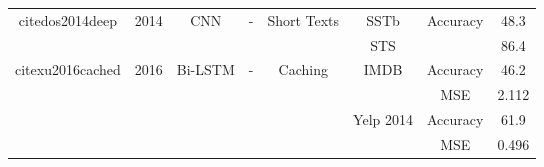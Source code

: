 \documentclass[12pt, a4paper, oneside]{report}
\begin{document}
\begin{tabular}{|c|c|c|c|c|c|cc|}
    \multirow{2}{*}{cite{dos2014deep}}                  & \multirow{2}{*}{2014} & \multirow{2}{*}{CNN}              & \multirow{2}{*}{-}                      & \multirow{2}{*}{Short Texts}                                                                           & SSTb                                  & \multicolumn{1}{c|}{\multirow{2}{*}{Accuracy}}                                                                                     & 48.3   \\ \cline{6-6} \cline{8-8} 
                                                                          &                       &                                   &                                         &                                                                                                        & STS                                   & \multicolumn{1}{c|}{}                                                                                                              & 86.4   \\ \hline
    \multirow{6}{*}{cite{xu2016cached}}                 & \multirow{6}{*}{2016} & \multirow{6}{*}{Bi-LSTM}          & \multirow{6}{*}{-}                      & \multirow{6}{*}{Caching}                                                                               & \multirow{2}{*}{IMDB}                 & \multicolumn{1}{c|}{Accuracy}                                                                                                      & 46.2   \\ \cline{7-8} 
                                                                          &                       &                                   &                                         &                                                                                                        &                                       & \multicolumn{1}{c|}{MSE}                                                                                                           & 2.112  \\ \cline{6-8} 
                                                                          &                       &                                   &                                         &                                                                                                        & \multirow{2}{*}{Yelp 2014}            & \multicolumn{1}{c|}{Accuracy}                                                                                                      & 61.9   \\ \cline{7-8} 
                                                                          &                       &                                   &                                         &                                                                                                        &                                       & \multicolumn{1}{c|}{MSE}                                                                                                           & 0.496  \\ \cline{6-8} 

\end{tabular}
\end{document}
